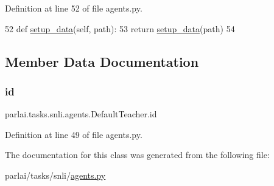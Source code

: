 Definition at line 52 of file agents.\+py.


\begin{DoxyCode}
52     \textcolor{keyword}{def }\hyperlink{namespaceparlai_1_1tasks_1_1multinli_1_1agents_a4fa2cb0ba1ed745336ad8bceed36b841}{setup\_data}(self, path):
53         \textcolor{keywordflow}{return} \hyperlink{namespaceparlai_1_1tasks_1_1multinli_1_1agents_a4fa2cb0ba1ed745336ad8bceed36b841}{setup\_data}(path)
54 
\end{DoxyCode}


\subsection{Member Data Documentation}
\mbox{\label{classparlai_1_1tasks_1_1snli_1_1agents_1_1DefaultTeacher_a53a712ad89d4c98e7501d2b307a6481c}} 
\subsubsection{\texorpdfstring{id}{id}}
{\footnotesize\ttfamily parlai.\+tasks.\+snli.\+agents.\+Default\+Teacher.\+id}



Definition at line 49 of file agents.\+py.



The documentation for this class was generated from the following file\+:\begin{DoxyCompactItemize}
\item 
parlai/tasks/snli/\hyperlink{parlai_2tasks_2snli_2agents_8py}{agents.\+py}\end{DoxyCompactItemize}
